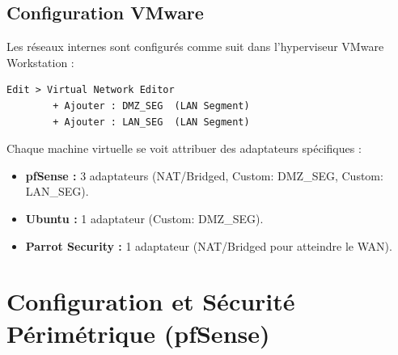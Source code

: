 \documentclass[12pt,a4paper,openany]{report}
\begin{document}
	\section{Configuration VMware}
	Les réseaux internes sont configurés comme suit dans l'hyperviseur VMware Workstation :
	\begin{lstlisting}[caption=Configuration des Réseaux Internes VMware]
		Edit > Virtual Network Editor
		+ Ajouter : DMZ_SEG  (LAN Segment)
		+ Ajouter : LAN_SEG  (LAN Segment)
	\end{lstlisting}
	
	Chaque machine virtuelle se voit attribuer des adaptateurs spécifiques :
	\begin{itemize}
		\item \textbf{pfSense :} 3 adaptateurs (NAT/Bridged, Custom: DMZ\_SEG, Custom: LAN\_SEG).
		\item \textbf{Ubuntu :} 1 adaptateur (Custom: DMZ\_SEG).
		\item \textbf{Parrot Security :} 1 adaptateur (NAT/Bridged pour atteindre le WAN).
	\end{itemize}
	
	\chapter{Configuration et Sécurité Périmétrique (pfSense)}
	
	
\end{document}
